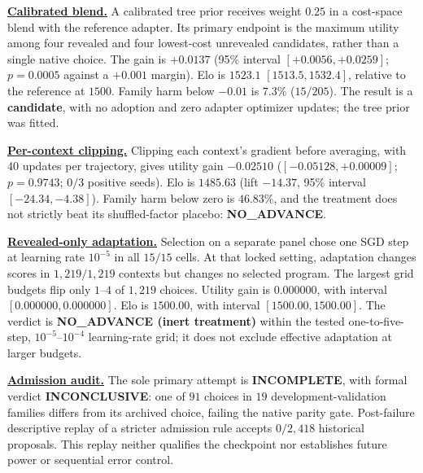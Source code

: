 \href{https://github.com/neverhuman/JopeDime/blob/40604b0936611697348dbed20b4cdd58cbe946df/docs/whitepaper/development_results.sources.json#L13}{\textbf{Calibrated blend.}}
A calibrated tree prior receives weight $0.25$ in a cost-space blend with
the reference adapter. Its primary endpoint is the maximum utility among
four revealed and four lowest-cost unrevealed candidates, rather than a
single native choice. The gain is $+0.0137$ (95\% interval
$[+0.0056,+0.0259]$; $p=0.0005$ against a $+0.001$ margin).
Elo is $1523.1$ $[1513.5,1532.4]$, relative to the reference at $1500$.
Family harm below $-0.01$ is $7.3\%$ ($15/205$).
The result is a \textbf{candidate}, with no adoption and zero adapter
optimizer updates; the tree prior was fitted.

\href{https://github.com/neverhuman/JopeDime/blob/40604b0936611697348dbed20b4cdd58cbe946df/docs/whitepaper/development_results.sources.json#L45}{\textbf{Per-context clipping.}}
Clipping each context's gradient before averaging, with 40 updates per
trajectory, gives utility gain $-0.02510$
($[-0.05128,+0.00009]$; $p=0.9743$; $0/3$ positive seeds).
Elo is $1485.63$ (lift $-14.37$, 95\% interval $[-24.34,-4.38]$).
Family harm below zero is $46.83\%$, and the treatment does not strictly
beat its shuffled-factor placebo: \textbf{NO\_ADVANCE}.

\href{https://github.com/neverhuman/JopeDime/blob/40604b0936611697348dbed20b4cdd58cbe946df/docs/whitepaper/development_results.sources.json#L76}{\textbf{Revealed-only adaptation.}}
Selection on a separate panel chose one SGD step at learning rate
$10^{-5}$ in all $15/15$ cells. At that locked setting, adaptation
changes scores in $1{,}219/1{,}219$ contexts but changes no selected
program. The largest grid budgets flip only $1$--$4$ of $1{,}219$ choices.
Utility gain is $0.000000$, with interval $[0.000000,0.000000]$.
Elo is $1500.00$, with interval $[1500.00,1500.00]$.
The verdict is \textbf{NO\_ADVANCE (inert treatment)} within the tested
one-to-five-step, $10^{-5}$--$10^{-4}$ learning-rate grid; it does not
exclude effective adaptation at larger budgets.

\href{https://github.com/neverhuman/JopeDime/blob/40604b0936611697348dbed20b4cdd58cbe946df/docs/whitepaper/development_results.sources.json#L107}{\textbf{Admission audit.}}
The sole primary attempt is \textbf{INCOMPLETE}, with formal verdict
\textbf{INCONCLUSIVE}: one of $91$ choices in $19$ development-validation
families differs from its archived choice, failing the native parity gate.
Post-failure descriptive replay of a stricter admission rule accepts
$0/2{,}418$ historical proposals. This replay neither qualifies the
checkpoint nor establishes future power or sequential error control.

